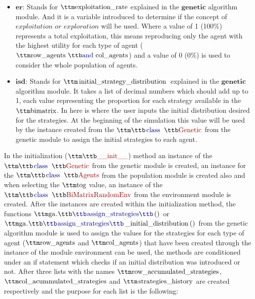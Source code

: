 \begin{itemize}
	\item $\textbf{er:}$ Stands for $\pythoninline{exploitation\_rate}$ explained in the $\textbf{genetic}$ algorithm module. And it is a variable introduced to determine if the concept of $\textit{exploitation or exploration}$ will be used. Where a value of 1 (100$\%$) represents a total exploitation, this means reproducing only the agent with the highest utility for each type of agent ($\pythoninline{row\_agents and col\_agents}$) and a value of 0 (0$\%$) is used to consider the whole population of agents.
	\item $\textbf{isd:}$ Stands for $\pythoninline{initial\_strategy\_distribution}$ explained in the $\textbf{genetic}$ algorithm module. It takes a list of decimal numbers which should add up to 1, each value representing the proportion for each strategy available in the $\pythoninline{bimatrix}$. In here is where the user inputs the initial distribution desired for the strategies. At the beginning of the simulation this value will be used by the instance created from the $\pythoninline{class Genetic}$ from the genetic module to assign the initial strategies to each agent.
\end{itemize}

In the initialization ($\pythoninline{\_\_init\_\_}$) method an instance of the $\pythoninline{class Genetic}$ from the genetic module is created, an instance for the $\pythoninline{class Agents}$ from the population module is created also and when selecting the $\pythoninline{tog}$ value, an instance of the $\pythoninline{class BiMatrixRandomEnv}$ from the environment module is created. After the instances are created within the initialization method, the functions $\pythoninline{ga.assign\_strategies()}$ or $\pythoninline{ga.assign\_strategies\_initial\_distribution()}$ from the genetic algorithm module is used to assign the values for the strategies for each type of agent ($\pythoninline{row\_agents}$ and $\pythoninline{col\_agents}$) that have been created through the instance of the module environment can be used, the methods are conditioned under an if statement which checks if an initial distribution was introduced or not. After three lists with the names $\pythoninline{row\_accumulated\_strategies}$, $\pythoninline{col\_acummulated\_strategies}$ and $\pythoninline{strategies\_history}$ are created respectively and the purpose for each list is the following:

